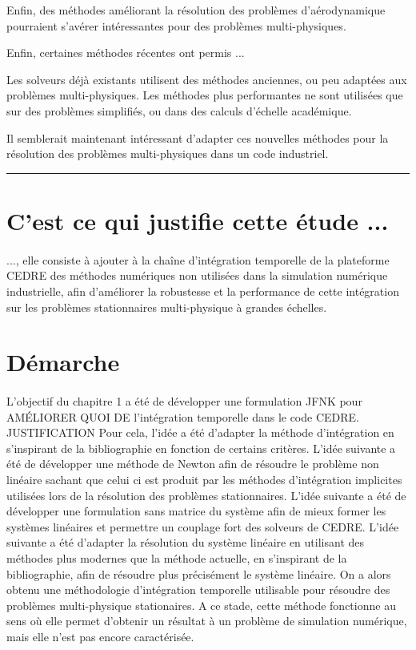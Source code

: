     Enfin, des méthodes améliorant la résolution des problèmes d'aérodynamique pourraient s'avérer intéressantes pour des problèmes multi-physiques.

    Enfin, certaines méthodes récentes ont permis ...

    Les solveurs déjà existants utilisent des méthodes anciennes, ou peu adaptées aux problèmes multi-physiques.
    Les méthodes plus performantes ne sont utilisées que sur des problèmes simplifiés, ou dans des calculs d'échelle académique.

    Il semblerait maintenant intéressant d'adapter ces nouvelles méthodes pour la résolution des problèmes multi-physiques dans un code industriel.

    \vspace{1cm}\hrule\vspace{1cm}

  \section*{C'est ce qui justifie cette étude ...}

    \paragraph{}
    ..., elle consiste à ajouter à la chaîne d'intégration temporelle de la plateforme CEDRE des méthodes numériques non utilisées dans la simulation numérique industrielle,
    afin d'améliorer la robustesse et la performance de cette intégration sur les problèmes stationnaires multi-physique à grandes échelles.


  \section*{Démarche}

    \paragraph{}
    L'objectif du chapitre 1 a été de développer une formulation JFNK pour AMÉLIORER QUOI DE l'intégration temporelle dans le code CEDRE.
    JUSTIFICATION
    Pour cela, l'idée a été d'adapter la méthode d'intégration en s'inspirant de la bibliographie en fonction de certains critères.
    L'idée suivante a été de développer une méthode de Newton afin de résoudre le problème non linéaire sachant que celui ci est produit par les méthodes d'intégration implicites utilisées lors de la résolution des problèmes stationnaires.
    L'idée suivante a été de développer une formulation sans matrice du système afin de mieux former les systèmes linéaires et permettre un couplage fort des solveurs de CEDRE.
    L'idée suivante a été d'adapter la résolution du système linéaire en utilisant des méthodes plus modernes que la méthode actuelle, en s'inspirant de la bibliographie, afin de résoudre plus précisément le système linéaire.
    On a alors obtenu une méthodologie d'intégration temporelle utilisable pour résoudre des problèmes multi-physique stationaires.
    A ce stade, cette méthode fonctionne au sens où elle permet d'obtenir un résultat à un problème de simulation numérique, mais elle n'est pas encore caractérisée.

